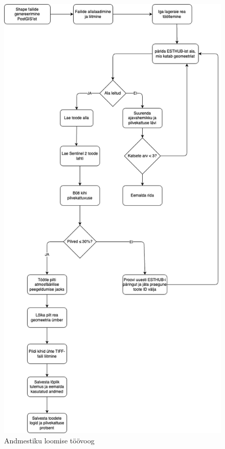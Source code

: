 \begin{figure}[H]
    \centering
    \includegraphics[width=.6\textwidth]{figures/andmestik/andmete_voog.drawio.png}
    \caption{Andmestiku loomise töövoog}
    \label{fig:terveflow}
\end{figure}
